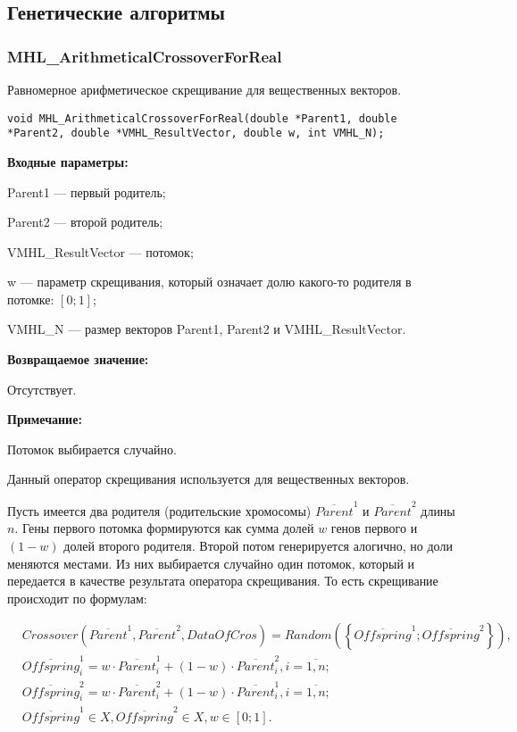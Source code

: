 \documentclass[a4paper,12pt]{article}
\begin{document}
\subsection{Генетические алгоритмы}

\subsubsection{MHL\_ArithmeticalCrossoverForReal}\label{MHL_ArithmeticalCrossoverForReal}

Равномерное арифметическое скрещивание для вещественных векторов.


\begin{lstlisting}[label=code_syntax_MHL_ArithmeticalCrossoverForReal,caption=Синтаксис]
void MHL_ArithmeticalCrossoverForReal(double *Parent1, double *Parent2, double *VMHL_ResultVector, double w, int VMHL_N);
\end{lstlisting}

\textbf{Входные параметры:}
 
Parent1 --- первый родитель;
 
Parent2 --- второй родитель;
 
VMHL\_ResultVector --- потомок;

w --- параметр скрещивания, который означает долю какого-то родителя в потомке: $[0;1]$;
 
VMHL\_N --- размер векторов Parent1, Parent2 и VMHL\_ResultVector.

\textbf{Возвращаемое значение:}

 Отсутствует.
 
\textbf{ Примечание:}

 Потомок выбирается случайно.
 
Данный оператор скрещивания используется для вещественных векторов.

Пусть имеется два родителя (родительские хромосомы) $ \overline{Parent}^1 $ и $ \overline{Parent}^2$ длины $n$. Гены первого потомка формируются как сумма долей $w$ генов первого и $ \left( 1-w\right) $ долей второго родителя. Второй потом генерируется алогично, но доли меняются местами.  Из них выбирается случайно один потомок, который и передается в качестве результата оператора скрещивания. То есть скрещивание происходит по формулам:

\begin{align}
\label{SetOfOperatorsAlgorithms:eq:ArithmeticalCrossoverForReal}
&Crossover \left( \overline{Parent}^1, \overline{Parent}^2, DataOfCros\right)=Random \left(\left\lbrace \overline{Offspring}^1; \overline{Offspring}^2\right\rbrace  \right), \\
& \overline{Offspring}^1_i=w\cdot\overline{Parent}^1_i+\left( 1-w\right)\cdot\overline{Parent}^2_i , i=\overline{1,n};\nonumber\\
&\overline{Offspring}^2_i=w\cdot\overline{Parent}^2_i+\left( 1-w\right)\cdot\overline{Parent}^1_i , i=\overline{1,n};\nonumber\\
&\overline{Offspring}^1\in X, \overline{Offspring}^2\in X, w\in \left[ 0; 1\right] .\nonumber
\end{align}
\end{document}
